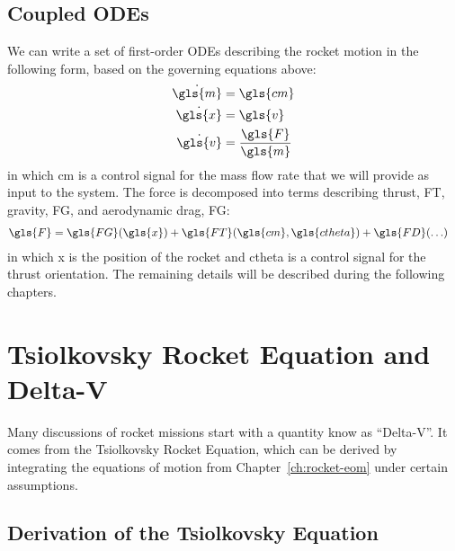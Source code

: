 \documentclass[12pt,openany]{book}
\begin{document}
\section{Coupled ODEs}

We can write a set of first-order ODEs describing the rocket motion in the following form, based on the governing equations above:
\begin{align}
  \dot{\gls{m}} &= \gls{cm} \\
  \dot{\gls{x}} &= \gls{v} \\
  \dot{\gls{v}} &= \frac{\gls{F}}{\gls{m}} \label{eq:accel}
\end{align}
in which \gls{cm} is a control signal for the mass flow rate that we will provide as input to the system. The force is decomposed into terms describing thrust, \gls{FT}, gravity, \gls{FG}, and aerodynamic drag, \gls{FG}:
\begin{align}
  \gls{F} &= \gls{FG}(\gls{x})
  + \gls{FT}(\gls{cm},\gls{ctheta})
  + \gls{FD}(\ldots) 
\end{align}
in which \gls{x} is the position of the rocket and \gls{ctheta} is a control signal for the thrust orientation. The remaining details will be described during the following chapters.

\chapter{Tsiolkovsky Rocket Equation and Delta-V}

Many discussions of rocket missions start with a quantity know as ``Delta-V''. It comes from the Tsiolkovsky Rocket Equation, which can be derived by integrating the equations of motion from Chapter~\ref{ch:rocket-eom} under certain assumptions.

\section{Derivation of the Tsiolkovsky Equation}
\end{document}
